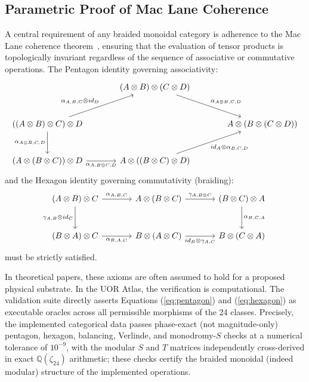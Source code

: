 \subsection{Parametric Proof of Mac Lane Coherence}
A central requirement of any braided monoidal category is adherence to the Mac Lane coherence theorem~\cite{maclane1963}, ensuring that the evaluation of tensor products is topologically invariant regardless of the sequence of associative or commutative operations. The Pentagon identity governing associativity:
\begin{equation}
\label{eq:pentagon}
\begin{tikzcd}[column sep=large, row sep=large]
& (A \otimes B) \otimes (C \otimes D) \arrow[dr, "\alpha_{A\otimes B,C,D}"] & \\
((A \otimes B) \otimes C) \otimes D \arrow[ur, "\alpha_{A,B,C} \otimes id_D"] \arrow[d, "\alpha_{A\otimes B,C,D}"'] & & A \otimes (B \otimes (C \otimes D)) \\
(A \otimes (B \otimes C)) \otimes D \arrow[r, "\alpha_{A,B\otimes C,D}"'] & A \otimes ((B \otimes C) \otimes D) \arrow[ur, "id_A \otimes \alpha_{B,C,D}"'] & 
\end{tikzcd}
\end{equation}
and the Hexagon identity governing commutativity (braiding):
\begin{equation}
\label{eq:hexagon}
\begin{tikzcd}[column sep=large, row sep=large]
(A \otimes B) \otimes C \arrow[r, "\alpha_{A,B,C}"] \arrow[d, "\gamma_{A,B} \otimes id_C"'] & A \otimes (B \otimes C) \arrow[r, "\gamma_{A,B\otimes C}"] & (B \otimes C) \otimes A \arrow[d, "\alpha_{B,C,A}"] \\
(B \otimes A) \otimes C \arrow[r, "\alpha_{B,A,C}"'] & B \otimes (A \otimes C) \arrow[r, "id_B \otimes \gamma_{A,C}"'] & B \otimes (C \otimes A)
\end{tikzcd}
\end{equation}
must be strictly satisfied. 

In theoretical papers, these axioms are often assumed to hold for a proposed physical substrate. In the UOR Atlas, the verification is computational. The validation suite directly asserts Equations (\ref{eq:pentagon}) and (\ref{eq:hexagon}) as executable oracles across all permissible morphisms of the 24 classes. Precisely, the implemented categorical data passes phase-exact (not magnitude-only) pentagon, hexagon, balancing, Verlinde, and monodromy-$S$ checks at a numerical tolerance of $10^{-9}$, with the modular $S$ and $T$ matrices independently cross-derived in exact $\mathbb{Q}(\zeta_{24})$ arithmetic; these checks certify the braided monoidal (indeed modular) structure of the implemented operations.
